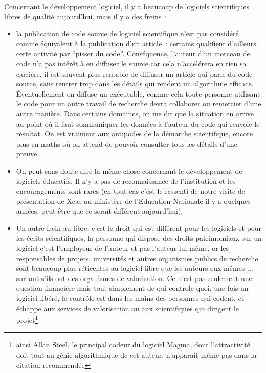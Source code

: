 \documentclass[a4paper,11pt]{article}
\begin{document}
\begin{giacjshere}
Concernant le d\`eveloppement logiciel,
il y a beaucoup de logiciels scientifiques libres de qualit\'e aujourd'hui, mais
il y a des freins~:
\begin{itemize}
\item la publication de code source de logiciel scientifique n'est pas
consid\'er\'e comme \'equivalent \`a la publication d'un article~:
certains qualifient d'ailleurs cette activit\'e par ``pisser du
code''. 
Cons\'equence, l'auteur d'un morceau de code n'a pas int\'er\^et
\`a en diffuser le source car cela n'acc\'el\'erera en rien
sa carri\`ere, il est souvent plus rentable
de diffuser un article qui parle du code source,
sans rentrer trop dans les
d\'etails qui rendent un algorithme efficace. \'Eventuellement
on diffuse un ex\'ecutable,
comme cela toute personne utilisant le code pour un autre
travail de recherche devra collaborer
ou remercier d'une autre mani\`ere. Dans certains
domaines, on me dit que la situation en arrive au point
o\`u il faut communiquer
les donn\'ees \`a l'auteur du code qui renvoie le r\'esultat.
On est vraiment aux antipodes de la d\'emarche scientifique,
encore plus en maths o\`u on attend de pouvoir consulter
tous les d\'etails d'une preuve.
\item On peut sans doute dire la m\^eme chose concernant
le d\'eveloppement de logiciels
\'educatifs. Il n'y a pas de reconnaissance de l'institution et
les encouragements sont rares (en tout cas c'est le ressenti
de notre visite de pr\'esentation de Xcas
au minist\`ere de l'Education Nationale
il y a quelques ann\'ees, peut-\^etre que ce serait diff\'erent
aujourd'hui).
\item Un autre frein au libre, c'est le droit qui est diff\'erent pour les logiciels
et pour les \'ecrits scientifiques, la personne qui dispose des droits
patrimomiaux sur un logiciel c'est l'employeur de l'auteur et
pas l'auteur lui-m\^eme, or les responsables de projets,
universit\'es et autres organismes
publics de recherche sont beaucoup plus r\'eticentes au logiciel
libre que les auteurs eux-m\^emes ... surtout s'ils ont des organismes
de valorisation. Ce n'est pas seulement une question financi\`ere
mais tout simplement de qui controle quoi, une fois un logiciel
lib\'er\'e, le contr\^ole est dans les mains des personnes qui codent,
et \'echappe aux services de valorisation ou aux scientifiques
qui dirigent le projet\footnote{ainsi Allan Steel, le principal codeur du logiciel 
Magma, dont l'attractivit\'e doit tout au g\'enie algorithmique de cet
auteur, n'apparait m\^eme pas dans la citation recommend\'ee
}
\end{itemize}
\end{giacjshere}
\end{document}
